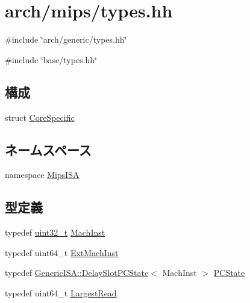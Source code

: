 \hypertarget{arch_2mips_2types_8hh}{
\section{arch/mips/types.hh}
\label{arch_2mips_2types_8hh}
}
{\ttfamily \#include \char`\"{}arch/generic/types.hh\char`\"{}}\par
{\ttfamily \#include \char`\"{}base/types.hh\char`\"{}}\par
\subsection*{構成}
\begin{DoxyCompactItemize}
\item 
struct \hyperlink{structMipsISA_1_1CoreSpecific}{CoreSpecific}
\end{DoxyCompactItemize}
\subsection*{ネームスペース}
\begin{DoxyCompactItemize}
\item 
namespace \hyperlink{namespaceMipsISA}{MipsISA}
\end{DoxyCompactItemize}
\subsection*{型定義}
\begin{DoxyCompactItemize}
\item 
typedef \hyperlink{Type_8hh_a435d1572bf3f880d55459d9805097f62}{uint32\_\-t} \hyperlink{namespaceMipsISA_a301c22ea09fa33dcfe6ddf22f203699c}{MachInst}
\item 
typedef uint64\_\-t \hyperlink{namespaceMipsISA_aec686c38e40c7f794f1435591c15c275}{ExtMachInst}
\item 
typedef \hyperlink{classGenericISA_1_1DelaySlotPCState}{GenericISA::DelaySlotPCState}$<$ MachInst $>$ \hyperlink{namespaceMipsISA_a2435b8311a00a8168bb1d33fb7c79b1e}{PCState}
\item 
typedef uint64\_\-t \hyperlink{namespaceMipsISA_a13e8c318dd29afdaf79751a072344db8}{LargestRead}
\end{DoxyCompactItemize}
